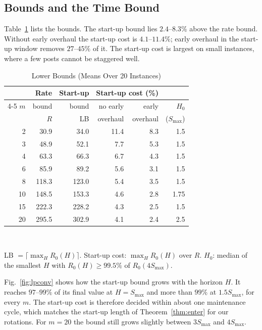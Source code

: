 \subsection{Bounds and the Time Bound}
\label{sec:exp:bounds}

Table~\ref{tab:bounds} lists the bounds.
The start-up bound lies $2.4$--$8.3\%$ above the rate bound.
Without early overhaul the start-up cost is $4.1$--$11.4\%$; early overhaul in the start-up window removes $27$--$45\%$ of it.
The start-up cost is largest on small instances, where a few posts cannot be staggered well.

\begin{table}[t]
  \centering
  \caption{Lower Bounds (Means Over 20 Instances)}
  \label{tab:bounds}
  \footnotesize
  \begin{tabular}{@{}rrrrrr@{}}
    \toprule
    & Rate & Start-up & \multicolumn{2}{c}{Start-up cost (\%)} & \\
    \cmidrule(lr){4-5}
    $m$ & bound & bound & no early & early & $H_0$ \\
    & $R$ & LB & overhaul & overhaul & ($S_{\max}$) \\
    \midrule
2 & 30.9 & 34.0 & 11.4 & 8.3 & 1.5 \\
3 & 48.9 & 52.1 & 7.7 & 5.3 & 1.5 \\
4 & 63.3 & 66.3 & 6.7 & 4.3 & 1.5 \\
6 & 85.9 & 89.2 & 5.6 & 3.1 & 1.5 \\
8 & 118.3 & 123.0 & 5.4 & 3.5 & 1.5 \\
10 & 148.5 & 153.3 & 4.6 & 2.8 & 1.75 \\
15 & 222.3 & 228.2 & 4.3 & 2.5 & 1.5 \\
20 & 295.5 & 302.9 & 4.1 & 2.4 & 2.5 \\
    \bottomrule
  \end{tabular}
  \\[2pt]
  \parbox{\linewidth}{\scriptsize LB $= \lceil \max_H R_0(H) \rceil$. Start-up cost: $\max_H R_0(H)$ over $R$. $H_0$: median of the smallest $H$ with $R_0(H) \ge 99.5\%$ of $R_0(4S_{\max})$.}
\end{table}

Fig.~\ref{fig:lpconv} shows how the start-up bound grows with the horizon $H$.
It reaches $97$--$99\%$ of its final value at $H = S_{\max}$ and more than $99\%$ at $1.5 S_{\max}$, for every $m$.
The start-up cost is therefore decided within about one maintenance cycle, which matches the start-up length of Theorem~\ref{thm:enter} for our rotations.
For $m = 20$ the bound still grows slightly between $3 S_{\max}$ and $4 S_{\max}$.

